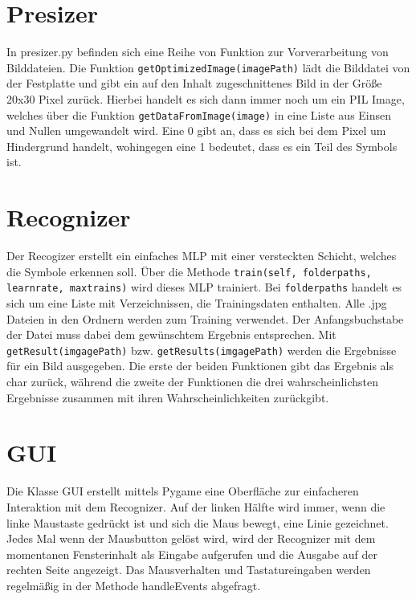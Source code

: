 \documentclass[10pt,a4paper,ngerman,oneside]{scrartcl}
\begin{document}
	\section{Presizer}
		In presizer.py befinden sich eine Reihe von Funktion zur Vorverarbeitung von Bilddateien.
		Die Funktion \texttt{getOptimizedImage(imagePath)} lädt die Bilddatei von der Festplatte und gibt ein auf den Inhalt zugeschnittenes 
		Bild in der Größe 20x30 Pixel zurück. Hierbei handelt es sich dann immer noch um ein PIL Image, welches über die Funktion
		\texttt{getDataFromImage(image)} in eine Liste aus Einsen und Nullen umgewandelt wird. Eine 0 gibt an, dass es sich bei dem Pixel um 
		Hindergrund handelt, wohingegen eine 1 bedeutet, dass es ein Teil des Symbols ist.

	\section{Recognizer} 
		Der Recogizer erstellt ein einfaches MLP mit einer versteckten Schicht, welches die Symbole erkennen soll.
		Über die Methode \texttt{train(self, folderpaths, learnrate, maxtrains)} wird dieses MLP trainiert. Bei \texttt{folderpaths} handelt es 
		sich um eine Liste mit Verzeichnissen, die Trainingsdaten enthalten. Alle .jpg Dateien in den Ordnern werden zum Training 
		verwendet. Der Anfangsbuchstabe der Datei muss dabei dem gewünschtem Ergebnis entsprechen.
		Mit \texttt{getResult(imgagePath)} bzw. \texttt{getResults(imgagePath)} werden die Ergebnisse für ein Bild ausgegeben. Die erste der beiden
		Funktionen gibt das Ergebnis als char zurück, während die zweite der Funktionen die drei wahrscheinlichsten Ergebnisse zusammen mit ihren
		Wahrscheinlichkeiten zurückgibt.

	\section{GUI}
		Die Klasse GUI erstellt mittels Pygame eine Oberfläche zur einfacheren Interaktion mit dem Recognizer.
		Auf der linken Hälfte wird immer, wenn die linke Maustaste gedrückt ist und sich die Maus bewegt, eine Linie 
		gezeichnet. Jedes Mal wenn der Mausbutton gelöst wird, wird der Recognizer mit dem momentanen Fensterinhalt als
		Eingabe aufgerufen und die Ausgabe auf der rechten Seite angezeigt. 
		Das Mausverhalten und Tastatureingaben werden regelmäßig in der Methode handleEvents abgefragt.


	
\end{document}

